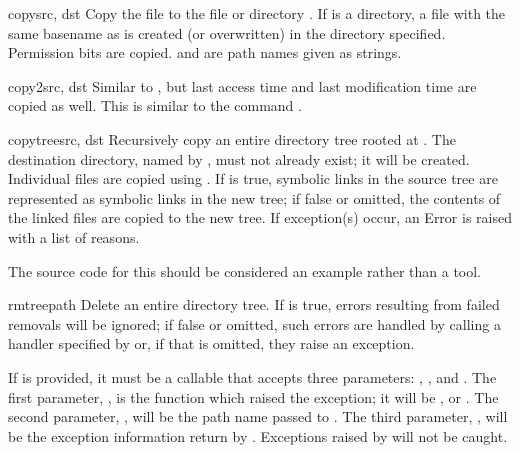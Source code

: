 \begin{funcdesc}{copy}{src, dst}
  Copy the file  to the file or directory .  If
   is a directory, a file with the same basename as  
  is created (or overwritten) in the directory specified.  Permission
  bits are copied.   and  are path names given as
  strings.
\end{funcdesc}

\begin{funcdesc}{copy2}{src, dst}
  Similar to , but last access time and last
  modification time are copied as well.  This is similar to the
  \UNIX{} command  .
\end{funcdesc}

\begin{funcdesc}{copytree}{src, dst}
  Recursively copy an entire directory tree rooted at .  The
  destination directory, named by , must not already exist;
  it will be created.  Individual files are copied using
  .  If  is true, symbolic links in
  the source tree are represented as symbolic links in the new tree;
  if false or omitted, the contents of the linked files are copied to
  the new tree.  If exception(s) occur, an Error is raised
  with a list of reasons.

  The source code for this should be considered an example rather than 
  a tool.
\end{funcdesc}

\begin{funcdesc}{rmtree}{path}
  Delete an entire directory tree.
  If  is true,
  errors resulting from failed removals will be ignored; if false or
  omitted, such errors are handled by calling a handler specified by
   or, if that is omitted, they raise an exception.

  If  is provided, it must be a callable that accepts
  three parameters: , , and .
  The first parameter, , is the function which raised
  the exception; it will be ,  or
  .  The second parameter, , will be
  the path name passed to .  The third parameter,
  , will be the exception information return by
  .  Exceptions raised by  will
  not be caught.
\end{funcdesc}

